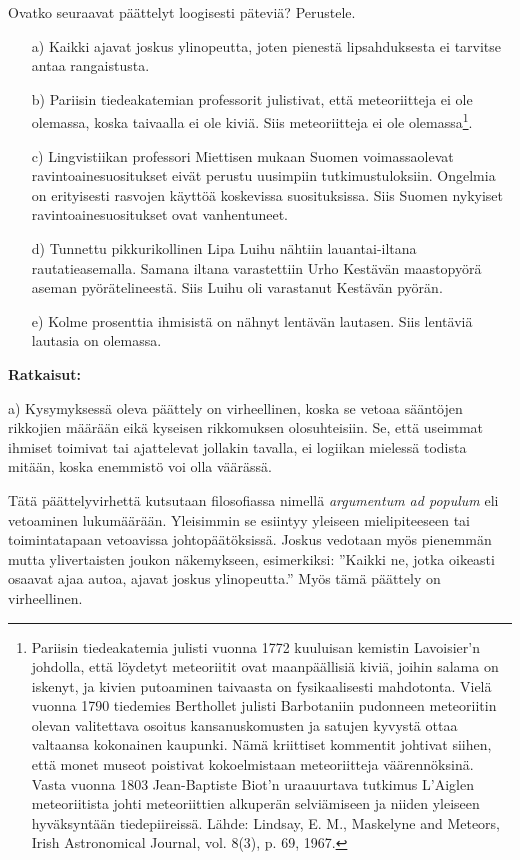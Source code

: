 \begin{esimerkki}
Ovatko seuraavat päättelyt loogisesti päteviä? Perustele.
\begin{itemize}
\item[a)] Kaikki ajavat joskus ylinopeutta, joten pienestä lipsahduksesta ei tarvitse antaa rangaistusta.
\item[b)] Pariisin tiedeakatemian professorit julistivat, että meteoriitteja ei ole olemassa, koska taivaalla ei ole kiviä. Siis meteoriitteja ei ole olemassa\footnote{Pariisin tiedeakatemia julisti vuonna 1772 kuuluisan kemistin Lavoisier'n johdolla, että löydetyt meteoriitit ovat maanpäällisiä kiviä, joihin salama on iskenyt, ja kivien putoaminen taivaasta on fysikaalisesti mahdotonta. Vielä vuonna 1790 tiedemies Berthollet julisti Barbotaniin pudonneen meteoriitin olevan valitettava osoitus kansanuskomusten ja satujen kyvystä ottaa valtaansa kokonainen kaupunki. Nämä kriittiset kommentit johtivat siihen, että monet museot poistivat kokoelmistaan meteoriitteja väärennöksinä. Vasta vuonna 1803 Jean-Baptiste Biot'n uraauurtava tutkimus L'Aiglen meteoriitista johti meteoriittien alkuperän selviämiseen ja niiden yleiseen hyväksyntään tiedepiireissä. Lähde: Lindsay, E. M., Maskelyne and Meteors, Irish Astronomical Journal, vol. 8(3), p. 69, 1967.}.
\item[c)] Lingvistiikan professori Miettisen mukaan Suomen voimassaolevat ravintoainesuositukset eivät perustu uusimpiin tutkimustuloksiin. Ongelmia on erityisesti rasvojen käyttöä koskevissa suosituksissa. Siis Suomen nykyiset ravintoainesuositukset ovat vanhentuneet.
\item[d)] Tunnettu pikkurikollinen Lipa Luihu nähtiin lauantai-iltana rautatieasemalla. Samana iltana varastettiin Urho Kestävän maastopyörä aseman pyörätelineestä. Siis Luihu oli varastanut Kestävän pyörän.
\item[e)] Kolme prosenttia ihmisistä on nähnyt lentävän lautasen. Siis lentäviä lautasia on olemassa.
\end{itemize}

{\bf Ratkaisut:}

a) Kysymyksessä oleva päättely on virheellinen, koska se vetoaa sääntöjen rikkojien määrään eikä kyseisen rikkomuksen olosuhteisiin. Se, että useimmat ihmiset toimivat tai ajattelevat jollakin tavalla, ei logiikan mielessä todista mitään, koska enemmistö voi olla väärässä.

Tätä päättelyvirhettä kutsutaan filosofiassa nimellä {\em argumentum ad populum} eli vetoaminen lukumäärään.  Yleisimmin se esiintyy yleiseen mielipiteeseen tai toimintatapaan vetoavissa johtopäätöksissä. Joskus vedotaan myös pienemmän mutta ylivertaisten joukon näkemykseen, esimerkiksi: ''Kaikki ne, jotka oikeasti osaavat ajaa autoa, ajavat joskus ylinopeutta.'' Myös tämä päättely on virheellinen.


\end{esimerkki}
